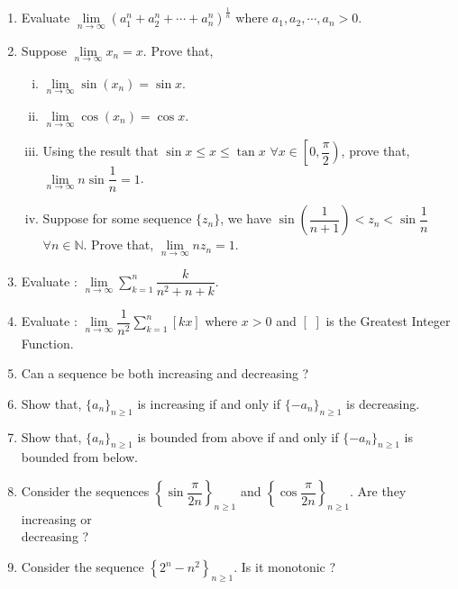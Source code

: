 \documentclass[11pt, a4paper]{article}
\begin{document}
\begin{enumerate}
	\item Evaluate $\lim \limits_{n \rightarrow \infty} \left( a_1^n + a_2^n + \cdots + a_n^n \right)^{\frac{1}{n}}$ where $a_1, a_2, \cdots, a_n > 0$.
	
	\item Suppose $\lim \limits_{n \rightarrow \infty} x_n = x$. Prove that,
		\begin{enumerate}[(i)]
			\item $\lim \limits_{n \rightarrow \infty} \sin (x_n) = \sin x$.
			\item $\lim \limits_{n \rightarrow \infty} \cos (x_n) = \cos x$.
			\item Using the result that $\sin x \leq x \leq \tan x$ $\forall x \in \left[0, \dfrac{\pi}{2}\right)$, prove that, $\lim \limits_{n \rightarrow \infty} n \sin \dfrac{1}{n} = 1$.
			\item Suppose for some sequence $\{z_n\}$, we have $\sin \left( \dfrac{1}{n+1} \right) < z_n < \sin \dfrac{1}{n}$ $\forall n \in \mathbb{N}$. Prove that, $\lim \limits_{n \rightarrow \infty} n z_n = 1$.
		
		\end{enumerate}
		
	\item Evaluate : $\lim \limits_{n \rightarrow \infty} \sum \limits_{k = 1}^{n} \dfrac{k}{n^2 + n + k}$.
	
	\item Evaluate : $\lim \limits_{n \rightarrow \infty} \dfrac{1}{n^2} \sum \limits_{k = 1}^{n} \left[ kx \right]$ where $x > 0$ and $\left[ \,\, \right]$ is the Greatest Integer Function.
	
	\item Can a sequence be both increasing and decreasing ?
	
	\item Show that, $\{a_n\}_{n \geq 1}$ is increasing if and only if $\{-a_n\}_{n \geq 1}$ is decreasing.
	
	\item Show that, $\{a_n\}_{n \geq 1}$ is bounded from above if and only if $\{-a_n\}_{n \geq 1}$ is bounded from below.
	
	\item Consider the sequences $\left\{\sin \dfrac{\pi}{2n}\right\}_{n \geq 1}$ and $\left\{\cos \dfrac{\pi}{2n}\right\}_{n \geq 1}$. Are they increasing or \\ decreasing ?
	
	\item Consider the sequence $\left\{ 2^n - n^2 \right\}_{n \geq 1}$. Is it monotonic ?
	

\end{enumerate}
\end{document}
